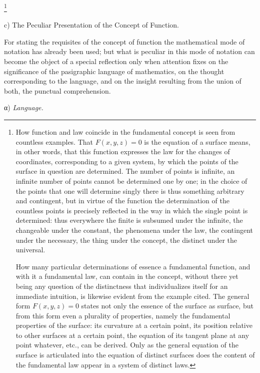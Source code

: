 \documentclass[12pt,a4paper,openany]{book}
\newcommand{\opage}[1]{\marginnote{\footnotesize\textit{[#1]}}}
\begin{document}
\footnote[1]{How function and law coincide in the fundamental concept is seen from countless examples. That $F(x, y, z) = 0$ is the equation of a surface means, in other words, that this function expresses the law for the changes of coordinates, corresponding to a given system, by which the points of the surface in question are determined. The number of points is infinite, an infinite number of points cannot be determined one by one; in the choice of the points that one will determine singly there is thus something arbitrary and contingent, but in virtue of the function the determination of the countless points is precisely reflected in the way in which the single point is determined: thus everywhere the finite is subsumed under the infinite, the changeable under the constant, the phenomena under the law, the contingent under the necessary, the thing under the concept, the distinct under the universal.\par
How many particular determinations of essence a fundamental function, and with it a fundamental law, can contain in the concept, without there yet being any question of the distinctness that individualizes itself for an immediate intuition, is likewise evident from the example cited. The general form $F(x, y, z) = 0$ states not only the essence of the surface as surface, but from this form even a plurality of properties, namely the fundamental properties of the surface: its curvature at a certain point, its position relative to other surfaces at a certain point, the equation of its tangent plane at any point whatever, etc., can be derived. Only as the general equation of the surface is articulated into the equation of distinct surfaces does the content of the fundamental law appear in a system of distinct laws.}

\begin{center}c) The Peculiar Presentation of the Concept of Function.\end{center}

For stating the requisites of the concept of function the
mathematical mode of notation has already been used; but what is peculiar
in this mode of notation can become the object
of a special reflection only when attention fixes
on the significance of the pasigraphic language of mathematics,
\setcounter{footnote}{0}%
\opage{21}on the thought corresponding to the language, and on the insight resulting from the union of both, %
the punctual comprehension.

\begin{center}α) \emph{Language.}\end{center}
\end{document}
